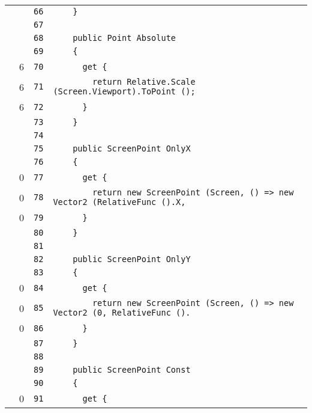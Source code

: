 \documentclass[a4paper,10pt]{article}
\begin{document}
\begin{longtable}[l]{lrrl}
\cellcolor{gray} &  & \verb~66~ & \verb~    }~\\
\cellcolor{gray} &  & \verb~67~ & \verb~~\\
\cellcolor{gray} &  & \verb~68~ & \verb~    public Point Absolute~\\
\cellcolor{gray} &  & \verb~69~ & \verb~    {~\\
\cellcolor{green} & 6 & \verb~70~ & \verb~      get {~\\
\cellcolor{green} & 6 & \verb~71~ & \verb~        return Relative.Scale (Screen.Viewport).ToPoint ();~\\
\cellcolor{green} & 6 & \verb~72~ & \verb~      }~\\
\cellcolor{gray} &  & \verb~73~ & \verb~    }~\\
\cellcolor{gray} &  & \verb~74~ & \verb~~\\
\cellcolor{gray} &  & \verb~75~ & \verb~    public ScreenPoint OnlyX~\\
\cellcolor{gray} &  & \verb~76~ & \verb~    {~\\
\cellcolor{red} & 0 & \verb~77~ & \verb~      get {~\\
\cellcolor{red} & 0 & \verb~78~ & \verb~        return new ScreenPoint (Screen, () => new Vector2 (RelativeFunc ().X, ~\\
\cellcolor{red} & 0 & \verb~79~ & \verb~      }~\\
\cellcolor{gray} &  & \verb~80~ & \verb~    }~\\
\cellcolor{gray} &  & \verb~81~ & \verb~~\\
\cellcolor{gray} &  & \verb~82~ & \verb~    public ScreenPoint OnlyY~\\
\cellcolor{gray} &  & \verb~83~ & \verb~    {~\\
\cellcolor{red} & 0 & \verb~84~ & \verb~      get {~\\
\cellcolor{red} & 0 & \verb~85~ & \verb~        return new ScreenPoint (Screen, () => new Vector2 (0, RelativeFunc ().~\\
\cellcolor{red} & 0 & \verb~86~ & \verb~      }~\\
\cellcolor{gray} &  & \verb~87~ & \verb~    }~\\
\cellcolor{gray} &  & \verb~88~ & \verb~~\\
\cellcolor{gray} &  & \verb~89~ & \verb~    public ScreenPoint Const~\\
\cellcolor{gray} &  & \verb~90~ & \verb~    {~\\
\cellcolor{red} & 0 & \verb~91~ & \verb~      get {~\\

\end{longtable}
\end{document}
